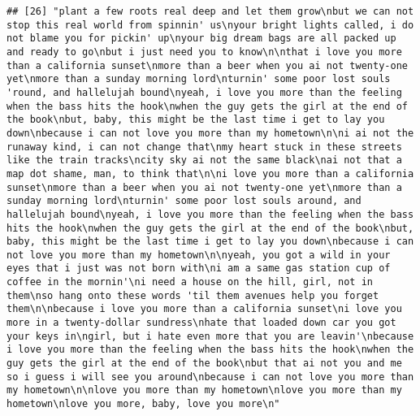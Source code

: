 \documentclass[]{article}
\begin{document}
\begin{verbatim}
## [26] "plant a few roots real deep and let them grow\nbut we can not stop this real world from spinnin' us\nyour bright lights called, i do not blame you for pickin' up\nyour big dream bags are all packed up and ready to go\nbut i just need you to know\n\nthat i love you more than a california sunset\nmore than a beer when you ai not twenty-one yet\nmore than a sunday morning lord\nturnin' some poor lost souls 'round, and hallelujah bound\nyeah, i love you more than the feeling when the bass hits the hook\nwhen the guy gets the girl at the end of the book\nbut, baby, this might be the last time i get to lay you down\nbecause i can not love you more than my hometown\n\ni ai not the runaway kind, i can not change that\nmy heart stuck in these streets like the train tracks\ncity sky ai not the same black\nai not that a map dot shame, man, to think that\n\ni love you more than a california sunset\nmore than a beer when you ai not twenty-one yet\nmore than a sunday morning lord\nturnin' some poor lost souls around, and hallelujah bound\nyeah, i love you more than the feeling when the bass hits the hook\nwhen the guy gets the girl at the end of the book\nbut, baby, this might be the last time i get to lay you down\nbecause i can not love you more than my hometown\n\nyeah, you got a wild in your eyes that i just was not born with\ni am a same gas station cup of coffee in the mornin'\ni need a house on the hill, girl, not in them\nso hang onto these words 'til them avenues help you forget them\n\nbecause i love you more than a california sunset\ni love you more in a twenty-dollar sundress\nhate that loaded down car you got your keys in\ngirl, but i hate even more that you are leavin'\nbecause i love you more than the feeling when the bass hits the hook\nwhen the guy gets the girl at the end of the book\nbut that ai not you and me so i guess i will see you around\nbecause i can not love you more than my hometown\n\nlove you more than my hometown\nlove you more than my hometown\nlove you more, baby, love you more\n"                                                                                                                                                                                                                                                                                                                                                                                                                                                                                                                                                                                                                                                                                                                                                                                                                                                                

\end{verbatim}
\end{document}

